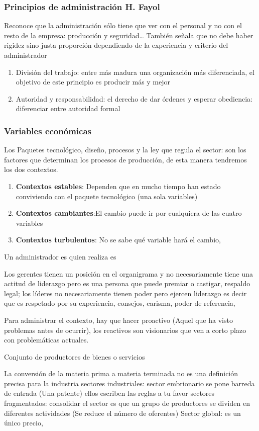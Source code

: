 \subsubsection{Principios de administración H. Fayol}
Reconoce que la administración sólo tiene que ver con el personal y no con el resto de la empresa: producción y seguridad\dots
También señala que no debe haber rigidez sino justa proporción dependiendo de la experiencia y criterio del administrador
\begin{enumerate}
    \item División del trabajo: entre más madura una organización más diferenciada, el objetivo de este principio es producir más y mejor
    \item Autoridad y responsabilidad: el derecho de dar órdenes y esperar obediencia: diferenciar entre autoridad formal
\end{enumerate}

\subsubsection{Variables económicas}
Los Paquetes tecnológico, diseño, procesos y la ley que regula el sector: son los factores que determinan los procesos de producción, de esta manera tendremos los dos contextos.
\begin{enumerate}
    \item \textbf{Contextos estables}: Dependen que en mucho tiempo han estado conviviendo con el paquete tecnológico (una sola variables)
    \item \textbf{Contextos cambiantes}:El cambio puede ir por cualquiera de las cuatro variables
    \item \textbf{Contextos turbulentos}: No se sabe qué variable hará el cambio,
\end{enumerate}
Un administrador es quien realiza es

Los gerentes tienen un posición en el organigrama y no necesariamente tiene una actitud de liderazgo pero es una persona que puede premiar o castigar, respaldo legal; los líderes no necesariamente tienen poder pero ejercen liderazgo es decir que es respetado por su experiencia, consejos, carisma, poder de referencia, 

Para administrar el contexto, hay que hacer proactivo (Aquel que ha visto problemas antes de ocurrir), los reactivos son visionarios que ven a corto plazo con problemáticas actuales.
\begin{definition}[Industria]
    Conjunto de productores de bienes o servicios
\end{definition}
La conversión de la materia prima a materia terminada no es una definición precisa para la industria
sectores industriales: sector embrionario se pone barreda de entrada (Una patente) ellos escriben las reglas a tu favor
sectores fragmentados: consolidar el sector es que un grupo de productores se dividen en diferentes actividades (Se reduce el número de oferentes)
Sector global: es un único precio, 

